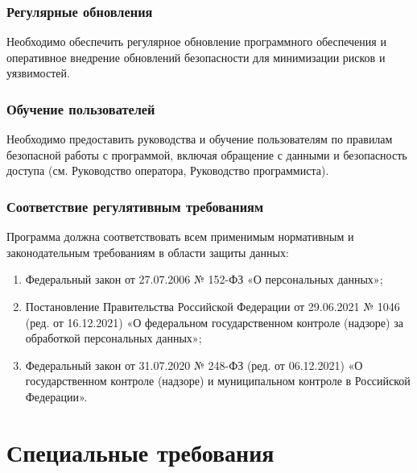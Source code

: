 \documentclass[14pt,a4paper,final]{extreport}
\begin{document}
\vspace{0.8cm}

\subsubsection{Регулярные обновления}
Необходимо обеспечить регулярное обновление программного обеспечения и оперативное внедрение обновлений безопасности для минимизации рисков и уязвимостей.




\vspace{0.8cm}
\subsubsection{Обучение пользователей}
Необходимо предоставить руководства и обучение пользователям по правилам безопасной работы с программой, включая обращение с данными и безопасность доступа (см. Руководство оператора, Руководство программиста).

\vspace{0.8cm}
\subsubsection{Соответствие регулятивным требованиям}
Программа должна соответствовать всем применимым нормативным и законодательным требованиям в области защиты данных:
\begin{enumerate}[label=\asbuk*),ref=\asbuk*]
	\item Федеральный закон от 27.07.2006 № 152-ФЗ «О персональных данных»;

	\item Постановление Правительства Российской Федерации от 29.06.2021 № 1046 (ред. от 16.12.2021) «О федеральном государственном контроле (надзоре) за обработкой персональных данных»;

	\item Федеральный закон от 31.07.2020 № 248-ФЗ (ред. от 06.12.2021) «О государственном контроле (надзоре) и муниципальном контроле в Российской Федерации».
\end{enumerate} 

\pagebreak %

\section{Специальные требования}
\end{document}
